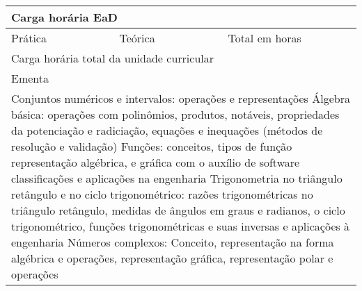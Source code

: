 \begin{quadro}[ht!]
\begin{tabular}{|p{3cm} p{2cm} p{3cm} p{2cm} p{3cm} p{2cm}|}
\multicolumn{6}{|p{15cm}|}{\cellcolor{blue1} Carga horária EaD} \\ \hline
\multicolumn{1}{|p{3cm}|}{\raggedleft Prática} & \multicolumn{1}{p{1cm}|}{\centering 0} &  \multicolumn{1}{p{3cm}|}{\raggedleft Teórica}  & \multicolumn{1}{p{1cm}|}{\centering 0} & \multicolumn{1}{p{3cm}|}{\raggedleft Total em horas} & \multicolumn{1}{p{1cm}|}{\raggedleft 0} \\ \hline
\multicolumn{5}{|p{13cm}|}{\cellcolor{blue1} Carga horária total da unidade curricular} & \multicolumn{1}{p{1cm}|}{\raggedleft 60	}\\\hline
\multicolumn{6}{|p{15cm}|}{\cellcolor{blue1} Ementa} \\\hline
\hline\multicolumn{6}{|p{15cm}|}{\scriptsize Conjuntos numéricos e intervalos: operações e representações Álgebra básica: operações com polinômios, produtos, notáveis, propriedades da potenciação e radiciação, equações e inequações (métodos de resolução e validação) Funções: conceitos, tipos de função representação algébrica, e gráfica com o auxílio de software classificações e aplicações na engenharia Trigonometria no triângulo retângulo e no ciclo trigonométrico: razões trigonométricas no triângulo retângulo, medidas de ângulos em graus e radianos, o ciclo trigonométrico, funções trigonométricas e suas inversas e aplicações à engenharia Números complexos: Conceito, representação na forma algébrica e operações, representação gráfica, representação polar e operações}\\\hline
\hline
	\end{tabular}
\end{quadro}
